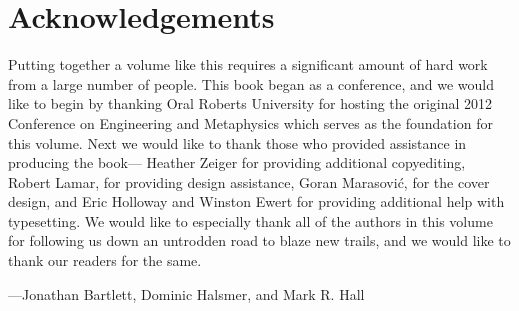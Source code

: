 \chapter*{Acknowledgements}

Putting together a volume like this requires a significant amount of hard work from a large number of people.  This book began as a conference, and we would like to begin by thanking Oral Roberts University for hosting the original 2012 Conference on Engineering and Metaphysics which serves as the foundation for this volume.  Next we would like to thank those who provided assistance in producing the book---
Heather Zeiger for providing additional copyediting, 
Robert Lamar, for providing design assistance,
Goran Marasović, for the cover design,
and Eric Holloway and Winston Ewert for providing additional help with typesetting.  We would like to especially thank all of the authors in this volume for following us down an untrodden road to blaze new trails, and we would like to thank our readers for the same.

\baselineskip

\hfill ---Jonathan Bartlett, Dominic Halsmer, and Mark R. Hall
